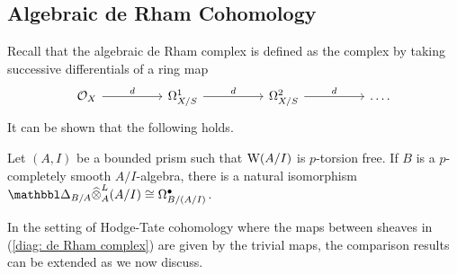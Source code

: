 \subsection{Algebraic de Rham Cohomology}\label{subsec: algebraic de Rham cohomology}
Recall that the algebraic de Rham complex is defined as the complex by taking successive differentials of a ring map 
\begin{equation}\label{diag: de Rham complex}
\begin{tikzcd}
	{\Ocal_{X}} && {\Omega_{X/S}^{1}} && {\Omega_{X/S}^{2}} && \dots.
	\arrow["d", from=1-1, to=1-3]
	\arrow["d", from=1-3, to=1-5]
	\arrow["d", from=1-5, to=1-7]
\end{tikzcd}
\end{equation}
It can be shown that the following holds. 
\begin{theorem}\label{thm: affinoid de Rham comparison}
    Let $(A,I)$ be a bounded prism such that $\mathrm{W}(A/I)$ is $p$-torsion free. If $B$ is a $p$-completely smooth $A/I$-algebra, there is a natural isomorphism $\prism_{B/A}\widehat{\otimes}^{L}_{A}(A/I)\cong\Omega^{\bullet}_{B/(A/I)}$. 
\end{theorem}
In the setting of Hodge-Tate cohomology where the maps between sheaves in (\ref{diag: de Rham complex}) are given by the trivial maps, the comparison results can be extended as we now discuss. 
